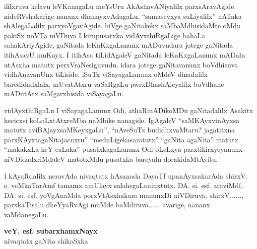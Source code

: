 ililxruva kelavu leVKanagaLu meYsUru AkAshavANiyalilx parxsAravAgide. nideRV\-shakarige nananx dhanayxvAdagaLu. ``samaseyxya suLiyalilx'' nATaka shAlegaLalilx parxyoVga\-vAgide. hiVge gaNitakekx saMbaMdhisidaMte oMdu pakiSx noVTa niVDuva I kirupusatxka vidAyxthiR\-gaLige bahaLa sahakAriyAgide, gaNitada leKaKxgaLanunx mADuvudara jotege gaNitada itihAsavU muKayx. I itihAsa tiLidAgaleV gaNitada leKaKxgaLanunx mADalu utAsxha matutx perxVraNesiguvudu. idara jotege gaNitavanunx boVdhisuva vidhAnavanUnx tiLiside. iSuTx viSayagaLanunx oMdeV dinadalilx baredidadxlalx, mUvatAtxru vaSaRgaLu pwrxDhashAle\-yalilx boVdhane mADutAtx saMgarxhisida viSayagaLu.

vidAyxthiRgaLu I viSayagaLanunx Odi, athaRmADikoMDu gaNitadalilx Asakitx\- hecicxsi\- koLuLxtAtxreMba naMbike nanagide. IgAgaleV ``saMKAyxvinAyxsa matutx aviBAjayx\break saMKeyxgaLu'',  ``nAveSuTx budidhxvaMtaru? jagatitxna parxKAyxtagaNitajacnxru'' ``meduLige\break kasaratutx'' ``gaNita agaNita'' matutx ``makakxLa keY caLaka'' pusatxkagaLanunx Odi oLeLxya parxtikirxyeyanunx niVDi\-dadxriMdaleV matotxMdu pusatxka bareyalu dorakidaMtAyitu.

\begin{center}
\noindent I kAyaRdalilx neravAda nivaqtatx hAsanada DayaTf upanAyxsakarAda shirxV. e. veMkaTarAmf tamamx amUlayx salahegaLaninxtutx. DA. si. esf. araviMdf, DA. si. esf. yoVgAnaMda  porxVtAsxhakara mununxDi niVDiruva, shirxV$\ldots\ldots$, parxkaTisalu dheYyaRvAgi muMde baMdiruva$\ldots\ldots$ avarige, nananx vaMdanegaLu.
\end{center}

\begin{flushright}
{\bf veY. esf. subarxhamxNayx}\\
nivaqtatx gaNita shikaSxka
\end{flushright}

\newpage

